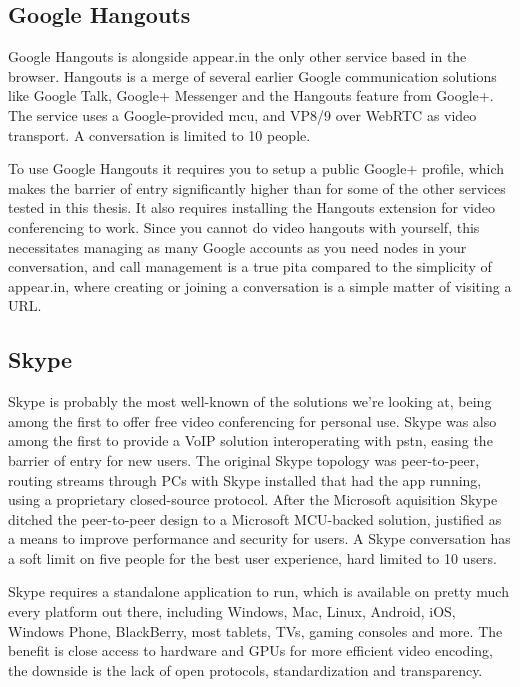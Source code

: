 

\subsection{Google Hangouts}

Google Hangouts is alongside appear.in the only other service based in the browser. Hangouts is a merge of several earlier Google communication solutions like Google Talk, Google+ Messenger and the Hangouts feature from Google+. The service uses a Google-provided \gls{mcu}, and VP8/9 over WebRTC as video transport. A conversation is limited to 10 people.

To use Google Hangouts it requires you to setup a public Google+ profile, which makes the barrier of entry significantly higher than for some of the other services tested in this thesis. It also requires installing the Hangouts extension for video conferencing to work. Since you cannot do video hangouts with yourself, this necessitates managing as many Google accounts as you need nodes in your conversation, and call management is a true \gls{pita} compared to the simplicity of appear.in, where creating or joining a conversation is a simple matter of visiting a URL.


\subsection{Skype}

Skype is probably the most well-known of the solutions we're looking at, being among the first to offer free video conferencing for personal use. Skype was also among the first to provide a VoIP solution interoperating with \gls{pstn}, easing the barrier of entry for new users. The original Skype topology was peer-to-peer, routing streams through PCs with Skype installed that had the app running, using a proprietary closed-source protocol. After the Microsoft aquisition Skype ditched the peer-to-peer design to a Microsoft MCU-backed solution, justified as a means to improve performance and security for users. A Skype conversation has a soft limit on five people for the best user experience, hard limited to 10 users.

Skype requires a standalone application to run, which is available on pretty much every platform out there, including Windows, Mac, Linux, Android, iOS, Windows Phone, BlackBerry, most tablets, TVs, gaming consoles and more. The benefit is close access to hardware and GPUs for more efficient video encoding, the downside is the lack of open protocols, standardization and transparency.


